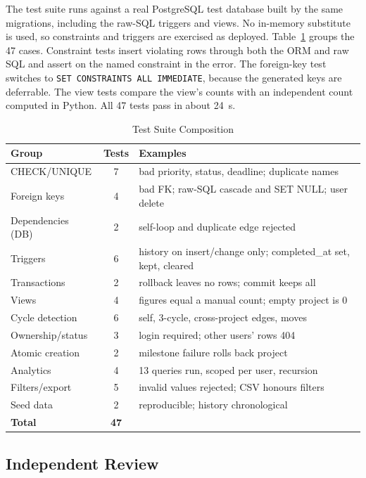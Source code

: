 \documentclass[conference]{IEEEtran}
\begin{document}
The test suite runs against a real PostgreSQL test database built by the same
migrations, including the raw-SQL triggers and views. No in-memory substitute is
used, so constraints and triggers are exercised as deployed.
Table~\ref{tab:tests} groups the 47 cases. Constraint tests insert violating rows
through both the ORM and raw SQL and assert on the named constraint in the error.
The foreign-key test switches to \texttt{SET CONSTRAINTS ALL IMMEDIATE},
because the generated keys are deferrable. The view tests compare the view's
counts with an independent count computed in Python. All 47 tests pass in about
24~s.

\begin{table}[t]
\caption{Test Suite Composition}
\label{tab:tests}
\centering
\scriptsize
\setlength{\tabcolsep}{3pt}
\begin{tabular}{@{}l c p{4.2cm}@{}}
\toprule
\textbf{Group} & \textbf{Tests} & \textbf{Examples} \\
\midrule
CHECK/UNIQUE & 7 & bad priority, status, deadline; duplicate names \\
Foreign keys & 4 & bad FK; raw-SQL cascade and SET NULL; user delete \\
Dependencies (DB) & 2 & self-loop and duplicate edge rejected \\
Triggers & 6 & history on insert/change only; completed\_at set, kept, cleared \\
Transactions & 2 & rollback leaves no rows; commit keeps all \\
Views & 4 & figures equal a manual count; empty project is 0 \\
Cycle detection & 6 & self, 3-cycle, cross-project edges, moves \\
Ownership/status & 3 & login required; other users' rows 404 \\
Atomic creation & 2 & milestone failure rolls back project \\
Analytics & 4 & 13 queries run, scoped per user, recursion \\
Filters/export & 5 & invalid values rejected; CSV honours filters \\
Seed data & 2 & reproducible; history chronological \\
\midrule
\textbf{Total} & \textbf{47} & \\
\bottomrule
\end{tabular}
\end{table}

\subsection{Independent Review}
\end{document}
